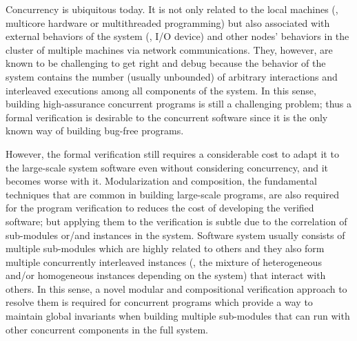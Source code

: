 Concurrency is ubiquitous today. 
It is  not only related to the local machines (\ie, multicore hardware or multithreaded programming)
but also associated with external behaviors of the system (\ie, I/O device) and other nodes' behaviors in the cluster of multiple machines via network communications.
They, however, are known to be challenging to get right and debug because the behavior of the system contains the number (usually unbounded) of arbitrary interactions and interleaved executions among all components of the system. 
In this sense, building high-assurance concurrent programs is still a challenging problem;
thus a formal verification is desirable to the concurrent software since
 it is the only known way of building bug-free programs.

However, the formal verification still requires a considerable cost to adapt it to the large-scale system software even without considering concurrency, and it becomes worse with it. 
Modularization and composition, the fundamental techniques that are common in building large-scale programs,
are also required for the program verification to reduces the cost of developing the verified software;
but applying them to the verification is subtle due to the correlation 
of sub-modules or/and instances in the system.
Software system usually consists of multiple sub-modules which are highly related to others
and they also form multiple concurrently interleaved instances (\ie, the mixture of heterogeneous and/or homogeneous instances depending on the system)
that interact with others.
In this sense, a novel modular and compositional verification approach to resolve them is required for concurrent programs
which provide a way to maintain global invariants when building multiple sub-modules that can run with 
other concurrent components in the full system.

